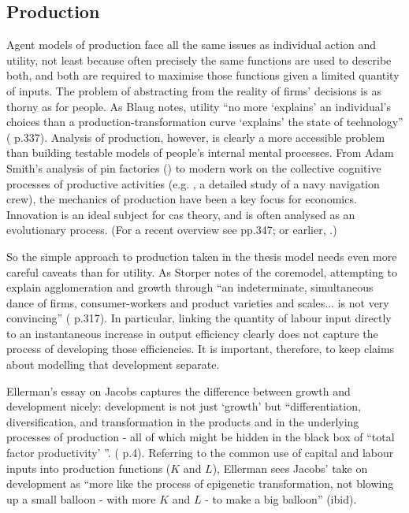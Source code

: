 \subsection{Production \label{sec:coord_production}}

Agent models of production face all the same issues as individual action and utility, not least because often precisely the same functions are used to describe both, and both are required to maximise those functions given a limited quantity of inputs. The problem of abstracting from the reality of firms' decisions is as thorny as for people. As Blaug notes, utility ``no more `explains' an individual's choices than a production-transformation curve `explains' the state of technology'' (\citealt{blaug_economic_1997} p.337). Analysis of production, however, is clearly a more accessible problem than building testable models of people's internal mental processes. From Adam Smith's analysis of pin factories (\citealt{smith_inquiry_1776}) to modern work on the collective cognitive processes of productive activities (e.g. \citealt{hutchins_cognition_1996}, a detailed study of a navy navigation crew), the mechanics of production have been a key focus for economics. Innovation is an ideal subject for \gls{cas} theory, and is often analysed as an evolutionary process. (For a recent overview see \citealt{safarzynska_evolutionary_2010} pp.347; or earlier, \citealt{dawid_agent-based_2006}.)

So the simple approach to production taken in the thesis model needs even more careful caveats than for utility. As Storper notes of the \gls{coremodel}, attempting to explain agglomeration and growth through ``an indeterminate, simultaneous dance of firms, consumer-workers and product varieties and scales... is not very convincing'' (\citealt{storper_agglomeration_2010} p.317). In particular, linking the quantity of labour input directly to an instantaneous increase in output efficiency clearly does not capture the process of developing those efficiencies. It is important, therefore, to keep claims about modelling that development separate. 

Ellerman's essay on Jacobs captures the difference between growth and development nicely: development is not just `growth' but ``differentiation, diversification, and transformation in the products and in the underlying processes of production - all of which might be hidden in the black box of ``total factor productivity' ''. (\citealt{ellerman_jane_2002} p.4). Referring to the common use of capital and labour inputs into production functions ($K$ and $L$), Ellerman sees Jacobs' take on development as ``more like the process of epigenetic transformation, not blowing up a small balloon - with more $K$ and $L$ - to make a big balloon'' (ibid). 

